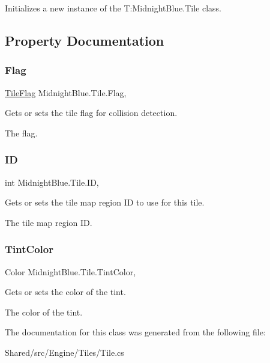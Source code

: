Initializes a new instance of the T\+:\+Midnight\+Blue.\+Tile class. 



\subsection{Property Documentation}
\hypertarget{class_midnight_blue_1_1_tile_a51397c4b6a08c8017a3d5555ed5822c6}{}\label{class_midnight_blue_1_1_tile_a51397c4b6a08c8017a3d5555ed5822c6} 
\subsubsection{\texorpdfstring{Flag}{Flag}}
{\footnotesize\ttfamily \hyperlink{namespace_midnight_blue_ad3f455dc6bab1e76768d1a468ae3e33b}{Tile\+Flag} Midnight\+Blue.\+Tile.\+Flag\hspace{0.3cm}{\ttfamily [get]}, {\ttfamily [set]}}



Gets or sets the tile flag for collision detection. 

The flag.\hypertarget{class_midnight_blue_1_1_tile_a67011be5ab290007a4a45c4b6b0d24f0}{}\label{class_midnight_blue_1_1_tile_a67011be5ab290007a4a45c4b6b0d24f0} 
\subsubsection{\texorpdfstring{ID}{ID}}
{\footnotesize\ttfamily int Midnight\+Blue.\+Tile.\+ID\hspace{0.3cm}{\ttfamily [get]}, {}}



Gets or sets the tile map region ID to use for this tile. 

The tile map region ID.\hypertarget{class_midnight_blue_1_1_tile_a01da016ec2ef47b50e6bac7e01ae031b}{}\label{class_midnight_blue_1_1_tile_a01da016ec2ef47b50e6bac7e01ae031b} 
\subsubsection{\texorpdfstring{Tint\+Color}{TintColor}}
{\footnotesize\ttfamily Color Midnight\+Blue.\+Tile.\+Tint\+Color\hspace{0.3cm}{\ttfamily [get]}, {}}



Gets or sets the color of the tint. 

The color of the tint.

The documentation for this class was generated from the following file\+:\begin{DoxyCompactItemize}
\item 
Shared/src/\+Engine/\+Tiles/Tile.\+cs\end{DoxyCompactItemize}
